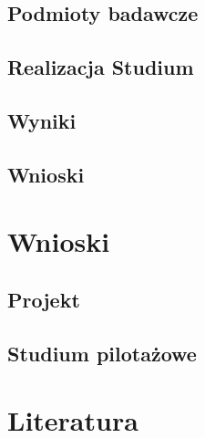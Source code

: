 \documentclass[polish,envcountsect,10pt]{article}
\begin{document}
\subsection{Podmioty badawcze}

\subsection{Realizacja Studium}

\subsection{Wyniki}

\subsection{Wnioski}


\section{Wnioski}

\subsection{Projekt}

\subsection{Studium pilotażowe}


\section{Literatura}
\end{document}
